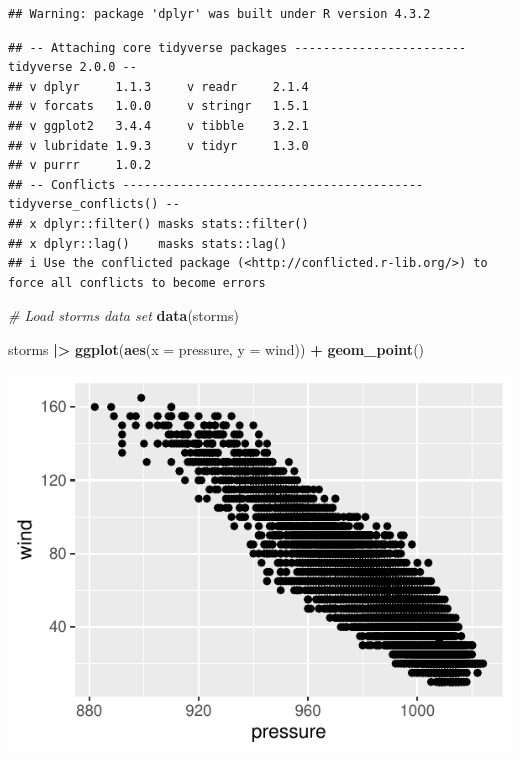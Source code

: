 \documentclass[
]{article}
\newenvironment{Shaded}{\begin{snugshade}}{\end{snugshade}}
\newcommand{\AttributeTok}[1]{\textcolor[rgb]{0.13,0.29,0.53}{#1}}
\newcommand{\CommentTok}[1]{\textcolor[rgb]{0.56,0.35,0.01}{\textit{#1}}}
\newcommand{\FunctionTok}[1]{\textcolor[rgb]{0.13,0.29,0.53}{\textbf{#1}}}
\newcommand{\NormalTok}[1]{#1}
\newcommand{\SpecialCharTok}[1]{\textcolor[rgb]{0.81,0.36,0.00}{\textbf{#1}}}
\begin{document}
\begin{verbatim}
## Warning: package 'dplyr' was built under R version 4.3.2
\end{verbatim}

\begin{verbatim}
## -- Attaching core tidyverse packages ------------------------ tidyverse 2.0.0 --
## v dplyr     1.1.3     v readr     2.1.4
## v forcats   1.0.0     v stringr   1.5.1
## v ggplot2   3.4.4     v tibble    3.2.1
## v lubridate 1.9.3     v tidyr     1.3.0
## v purrr     1.0.2     
## -- Conflicts ------------------------------------------ tidyverse_conflicts() --
## x dplyr::filter() masks stats::filter()
## x dplyr::lag()    masks stats::lag()
## i Use the conflicted package (<http://conflicted.r-lib.org/>) to force all conflicts to become errors
\end{verbatim}

\begin{Shaded}
\begin{Highlighting}[]
\CommentTok{\# Load storms data set}
\FunctionTok{data}\NormalTok{(storms)}

\NormalTok{storms }\SpecialCharTok{|\textgreater{}} \FunctionTok{ggplot}\NormalTok{(}\FunctionTok{aes}\NormalTok{(}\AttributeTok{x =}\NormalTok{ pressure, }\AttributeTok{y =}\NormalTok{ wind)) }\SpecialCharTok{+} 
  \FunctionTok{geom\_point}\NormalTok{()}
\end{Highlighting}
\end{Shaded}

\begin{center}\includegraphics{Introduction-to-RMarkdown_files/figure-latex/unnamed-chunk-1-1} \end{center}
\end{document}
